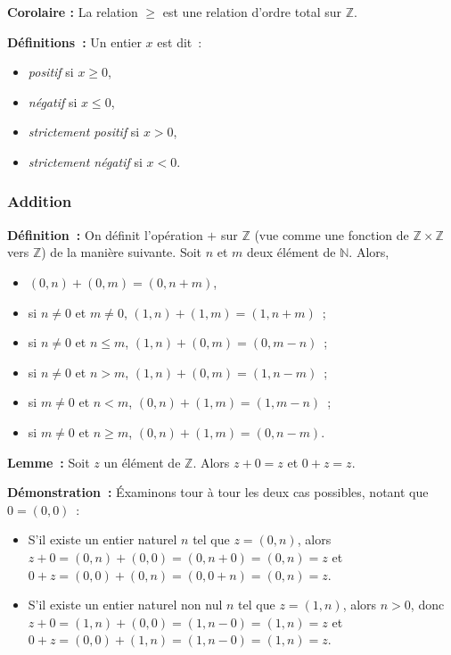    \done 

\medskip

\noindent\textbf{Corolaire :} La relation $\geq$ est une relation d'ordre total sur $\mathbb{Z}$.

\medskip

\noindent\textbf{Définitions :} Un entier $x$ est dit : 
\begin{itemize}[nosep]
    \item \textit{positif} si $x \geq 0$,
    \item \textit{négatif} si $x \leq 0$,
    \item \textit{strictement positif} si $x > 0$,
    \item \textit{strictement négatif} si $x < 0$.
\end{itemize}

\subsubsection{Addition}

\noindent\textbf{Définition :} 
    On définit l'opération $+$ sur $\mathbb{Z}$ (vue comme une fonction de $\mathbb{Z} \times \mathbb{Z}$ vers $\mathbb{Z}$) de la manière suivante.
    Soit $n$ et $m$ deux élément de $\mathbb{N}$.
    Alors, 
    \begin{itemize}[nosep]
        \item $(0,n) + (0,m) = (0, n+m)$,
        \item si $n \neq 0$ et $m \neq 0$, $(1,n) + (1,m) = (1, n+m)$ ;
        \item si $n \neq 0$ et $n \leq m$, $(1,n) + (0,m) = (0, m-n)$ ;
        \item si $n \neq 0$ et $n > m$, $(1,n) + (0,m) = (1, n-m)$ ;
        \item si $m \neq 0$ et $n < m$, $(0,n) + (1,m) = (1, m-n)$ ;
        \item si $m \neq 0$ et $n \geq m$, $(0,n) + (1,m) = (0, n-m)$.
    \end{itemize}

\medskip

\noindent\textbf{Lemme :} Soit $z$ un élément de $\mathbb{Z}$. 
    Alors $z + 0 = z$ et $0 + z = z$.

\medskip

\noindent\textbf{Démonstration :} Éxaminons tour à tour les deux cas possibles, notant que $0 = (0,0)$ : 
    \begin{itemize}[nosep]
        \item S'il existe un entier naturel $n$ tel que $z = (0,n)$, alors $z + 0 = (0,n) + (0,0) = (0,n+0) = (0,n) = z$ et $0 + z = (0,0) + (0,n) = (0,0+n) = (0,n) = z$.
        \item S'il existe un entier naturel non nul $n$ tel que $z = (1,n)$, alors $n > 0$, donc $z + 0 = (1,n) + (0,0) = (1,n-0) = (1,n) = z$ et $0 + z = (0,0) + (1,n) = (1,n-0) = (1,n) = z$.
    \end{itemize}
    
